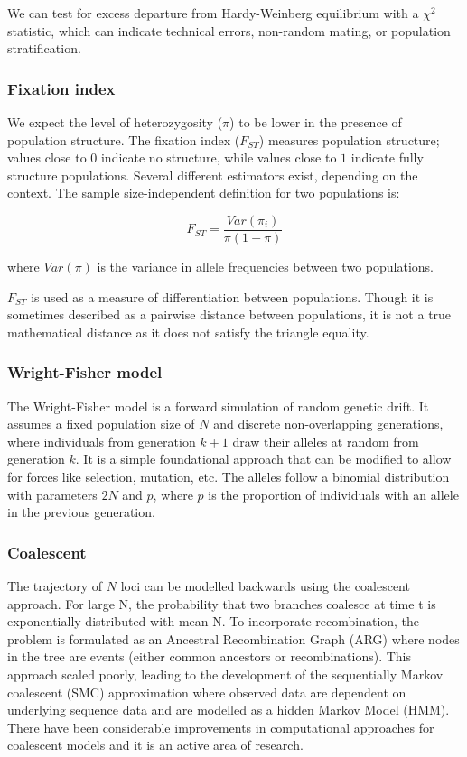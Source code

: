 We can test for excess departure from Hardy-Weinberg equilibrium with a $\chi^2$ statistic, which can indicate technical errors, non-random mating, or population stratification.

\subsubsection{Fixation index}

We expect the level of heterozygosity ($\pi$) to be lower in the presence of population structure. The fixation index ($F_{ST}$) measures population structure; values close to $0$ indicate no structure, while values close to $1$ indicate fully structure populations. Several different estimators exist, depending on the context\citep{bhatia_estimating_2013}. The sample size-independent definition for two populations is:

$$ F_{ST} = \frac{Var(\pi_{i})}{\pi(1-\pi)} $$

where $Var(\pi)$ is the variance in allele frequencies between two populations.

$F_{ST}$ is used as a measure of differentiation between populations. Though it is sometimes described as a pairwise distance between populations, it is not a true mathematical distance as it does not satisfy the triangle equality\citep{arbisser_fst_2020}.

\subsubsection{Wright-Fisher model}

The Wright-Fisher model is a forward simulation of random genetic drift\citep{hartl2007principles_3}. It assumes a fixed population size of $N$ and discrete non-overlapping generations, where individuals from generation $k+1$ draw their alleles at random from generation $k$. It is a simple foundational approach that can be modified to allow for forces like selection, mutation, etc. The alleles follow a binomial distribution with parameters $2N$ and $p$, where $p$ is the proportion of individuals with an allele in the previous generation.

\subsubsection{Coalescent}

The trajectory of $N$ loci can be modelled backwards using the coalescent approach\citep{hartl2007principles_3}. For large N, the probability that two branches coalesce at time t is exponentially distributed with mean N. To incorporate recombination, the problem is formulated as an Ancestral Recombination Graph (ARG) where nodes in the tree are events (either common ancestors or recombinations). This approach scaled poorly, leading to the development of the sequentially Markov coalescent (SMC) approximation where observed data are dependent on underlying sequence data and are modelled as a hidden Markov Model (HMM). There have been considerable improvements in computational approaches for coalescent models and it is an active area of research\citep{kelleher2019inferring}\citep{yc2022evaluation}\citep{zhang2023biobank}.

